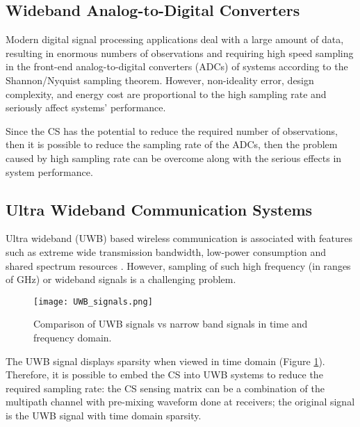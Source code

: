 \subsection{Wideband Analog-to-Digital Converters}

Modern digital signal processing applications deal with a large amount of data, resulting in enormous numbers of observations and requiring high speed sampling in the front-end analog-to-digital converters (ADCs) of systems according to the Shannon/Nyquist sampling theorem. However, non-ideality error, design complexity, and energy cost are proportional to the high sampling rate and seriously affect systems' performance. 

Since the CS has the potential to reduce the required number of observations, then it is possible to reduce the sampling rate of the ADCs, then the problem caused by high sampling rate can be overcome along with the serious effects in system performance.

\subsection{Ultra Wideband Communication Systems}


Ultra wideband (UWB) based wireless communication is associated with features such as extreme wide transmission bandwidth, low-power consumption and shared spectrum resources \cite{paredes2007ultra}.
However, sampling of such high frequency (in ranges of GHz) or wideband signals is a challenging problem.

\begin{figure}[tbh]
\begin{center}
\noindent
  \texttt{[image: UWB\_signals.png]}
  \end{center}
    \caption{Comparison of UWB signals vs narrow band signals in time and frequency domain.}\label{UWB_signals}
\end{figure}

The UWB signal displays sparsity when viewed in time domain (Figure \ref{UWB_signals}).  
Therefore, it is possible to embed the CS into UWB systems to reduce the required sampling rate: the CS sensing matrix can be a combination of the multipath channel with pre-mixing waveform done at receivers; the original signal is the UWB signal with time domain sparsity.


